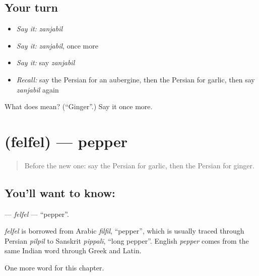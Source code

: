 \subsection*{Your turn}
\begin{itemize}
\raggedright
  \item \emph{Say it:} \emph{zanjabil}
  \item \emph{Say it:} \emph{zanjabil}, once more
  \item \emph{Say it:} say \emph{zanjabil}
  \item \emph{Recall:} say the Persian for an aubergine, then the Persian for garlic, then say \emph{zanjabil} again
\end{itemize}

\begin{tcolorbox}[breakable,colback=teal!4,colframe=teal!35!black,title={Before you move on}]
What does  mean? (\textquotedblleft{}Ginger\textquotedblright{}.) Say it once more.
\end{tcolorbox}
\section[\texorpdfstring{\fa{فلفل} (felfel)}{فلفل (felfel)}]{ (felfel) — pepper}

\label{lesson:FA-C102-felfel}



\begin{quote}
Before the new one: say the Persian for garlic, then the Persian for ginger.
\end{quote}

\subsection*{You'll want to know: }
\textbf{} — \emph{felfel} — \textquotedblleft{}pepper\textquotedblright{}.

\begin{cousinweb}
\emph{felfel} is borrowed from Arabic \emph{filfil}, \textquotedblleft{}pepper\textquotedblright{}, which is usually traced through Persian \emph{pilpil} to Sanskrit \emph{pippalī}, \textquotedblleft{}long pepper\textquotedblright{}. English \emph{pepper} comes from the same Indian word through Greek and Latin.
\end{cousinweb}

\begin{grammarlens}[title={What you've built}]
One more word for this chapter.
\end{grammarlens}

